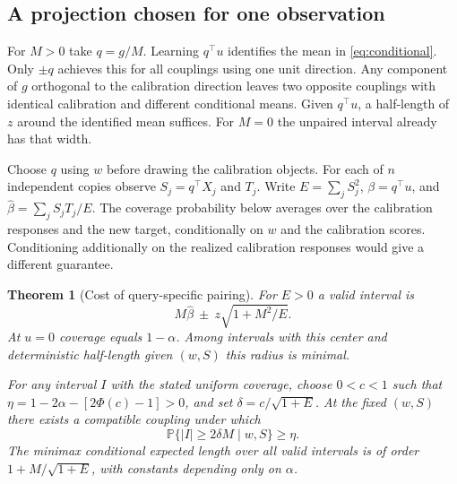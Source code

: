 \documentclass[11pt]{article}
\newtheorem{theorem}{Theorem}
\newcommand{\Prob}{\mathbb P}
\begin{document}
\subsection{A projection chosen for one observation}
For $M>0$ take $q=g/M$. Learning $q^\top u$ identifies the mean in \eqref{eq:conditional}. Only $\pm q$ achieves this for all couplings using one unit direction. Any component of $g$ orthogonal to the calibration direction leaves two opposite couplings with identical calibration and different conditional means. Given $q^\top u$, a half-length of $z$ around the identified mean suffices. For $M=0$ the unpaired interval already has that width.

Choose $q$ using $w$ before drawing the calibration objects. For each of $n$ independent copies observe $S_j=q^\top X_j$ and $T_j$. Write $E=\sum_j S_j^2$, $\beta=q^\top u$, and $\widehat\beta=\sum_j S_jT_j/E$. The coverage probability below averages over the calibration responses and the new target, conditionally on $w$ and the calibration scores. Conditioning additionally on the realized calibration responses would give a different guarantee.
\begin{theorem}[Cost of query-specific pairing]\label{thm:query}
For $E>0$ a valid interval is
\begin{equation}
 M\widehat\beta\ \pm\ z\sqrt{1+M^2/E}. \label{eq:paired}
\end{equation}
At $u=0$ coverage equals $1-\alpha$. Among intervals with this center and deterministic half-length given $(w,S)$ this radius is minimal.

For any interval $I$ with the stated uniform coverage, choose $0<c<1$ such that $\eta=1-2\alpha-[2\Phi(c)-1]>0$, and set $\delta=c/\sqrt{1+E}$. At the fixed $(w,S)$ there exists a compatible coupling under which
\begin{equation}
 \Prob\{|I|\ge2\delta M\mid w,S\}\ge\eta . \label{eq:lower}
\end{equation}
The minimax conditional expected length over all valid intervals is of order $1+M/\sqrt{1+E}$, with constants depending only on $\alpha$.
\end{theorem}
\end{document}
